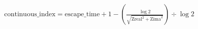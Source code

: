 \documentclass[preview, border=10pt]{standalone}
\newcommand*\widefbox[1]{\fbox{\hspace{2em}#1\hspace{2em}}}
\begin{document}
\abovedisplayskip=-3pt
\begin{align*}
\text{continuous\_index} = \text{escape\_time} + 1 - \left( \frac{\log 2}{\sqrt{\text{Zreal}^2 + \text{Zima}^2}} \right) \div \log 2
\end{align*}
\end{document}
